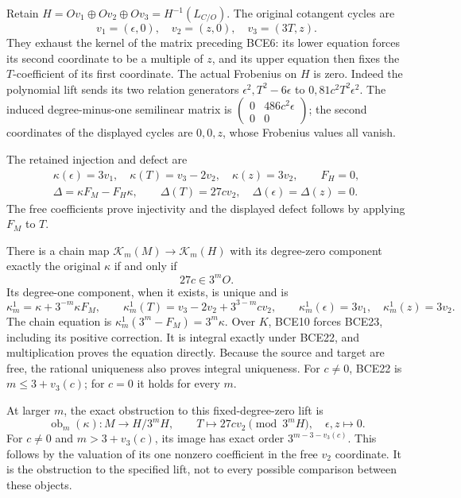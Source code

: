 Retain \(H=Ov_1\oplus Ov_2\oplus Ov_3=H^{-1}(L_{C/O})\).
The original cotangent cycles are
\[
v_1=(\epsilon,0),\quad v_2=(z,0),\quad v_3=(3T,z).
\]
They exhaust the kernel of the matrix preceding BCE6: its lower
equation forces its second coordinate to be a multiple of \(z\),
and its upper equation then fixes the \(T\)-coefficient of its
first coordinate. The actual Frobenius on \(H\) is zero.
Indeed the polynomial lift sends its two relation generators
\(\epsilon^2,T^2-6\epsilon\) to \(0,81c^2T^2\epsilon^2\).
The induced degree-minus-one semilinear matrix is
\(\left(\begin{smallmatrix}0&486c^2\epsilon\\0&0\end{smallmatrix}\right)\);
the second coordinates of the displayed cycles are \(0,0,z\),
whose Frobenius values all vanish.

The retained injection and defect are
\begin{equation}\tag{BCE21}
\begin{gathered}
\kappa(\epsilon)=3v_1,\quad
\kappa(T)=v_3-2v_2,\quad \kappa(z)=3v_2,\qquad F_H=0,\\
\Delta=\kappa F_M-F_H\kappa,\qquad
\Delta(T)=27cv_2,\quad\Delta(\epsilon)=\Delta(z)=0 .
\end{gathered}
\end{equation}
The free coefficients prove injectivity and the displayed defect
follows by applying \(F_M\) to \(T\).

There is a chain map
\(\mathcal K_m(M)\to\mathcal K_m(H)\) with its degree-zero
component exactly the original \(\kappa\) if and only if
\begin{equation}\tag{BCE22}
27c\in3^mO .
\end{equation}
Its degree-one component, when it exists, is unique and is
\begin{equation}\tag{BCE23}
\kappa_m^1=\kappa+3^{-m}\kappa F_M,\qquad
\kappa_m^1(T)=v_3-2v_2+3^{3-m}cv_2,\qquad
\kappa_m^1(\epsilon)=3v_1,\quad\kappa_m^1(z)=3v_2 .
\end{equation}
The chain equation is
\(\kappa_m^1(3^m-F_M)=3^m\kappa\).
Over \(K\), BCE10 forces BCE23, including its positive correction.
It is integral exactly under BCE22, and multiplication proves the
equation directly. Because the source and target are free, the
rational uniqueness also proves integral uniqueness.
For \(c\ne0\), BCE22 is \(m\le3+v_3(c)\); for \(c=0\) it holds
for every \(m\).

At larger \(m\), the exact obstruction to this fixed-degree-zero
lift is
\begin{equation}\tag{BCE24}
\operatorname{ob}_m(\kappa):M\longrightarrow H/3^mH,\qquad
T\longmapsto27cv_2\pmod{3^mH},\quad\epsilon,z\longmapsto0 .
\end{equation}
For \(c\ne0\) and \(m>3+v_3(c)\), its image has exact order
\(3^{m-3-v_3(c)}\). This follows by the valuation of its one
nonzero coefficient in the free \(v_2\) coordinate. It is the
obstruction to the specified lift, not to every possible
comparison between these objects.

